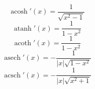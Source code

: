 \documentclass{article}
\DeclareMathOperator{\acosh}{acosh}
\DeclareMathOperator{\atanh}{atanh}
\DeclareMathOperator{\acoth}{acoth}
\DeclareMathOperator{\asech}{asech}
\DeclareMathOperator{\acsch}{acsch}
\begin{document}
    \begin{equation}
        \acosh'(x)=\frac{1}{\sqrt{x^2-1}}
    \end{equation}
    \begin{equation}
        \atanh'(x)=\frac{1}{1-x^2}
    \end{equation}
    \begin{equation}
        \acoth'(x)=\frac{1}{1-x^2}
    \end{equation}
    \begin{equation}
        \asech'(x)=-\frac{1}{|x|\sqrt{1-x^2}}
    \end{equation}
    \begin{equation}
        \acsch'(x)=-\frac{1}{|x|\sqrt{x^2+1}}
    \end{equation}
\end{document}
